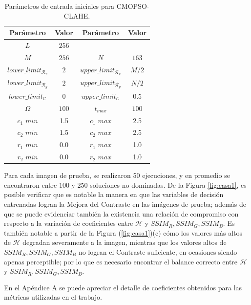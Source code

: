 \begin{table}[H]
\setlength{\abovecaptionskip}{2pt plus 3pt minus 2pt} %
\caption[Parámetros de entrada para $MOPSO$]{Parámetros de entrada iniciales para CMOPSO-CLAHE.}
\begin{center}
 \begin{tabular}{||c c | c c||} 
 \hline
 Parámetro & Valor & Parámetro & Valor \\ [0.5ex] 
 \hline\hline
 $L$ & $256$ &     &       \\ 
 \hline
 $M$ & $256$ & $N$ & $163$ \\ 
 \hline
 $lower\_limit_{\mathscr{R}_x}$ & $2$ & $upper\_limit_{\mathscr{R}_x}$ & $M/2$ \\ 
 \hline
 $lower\_limit_{\mathscr{R}_y}$ & $2$ & $upper\_limit_{\mathscr{R}_y}$ & $N/2$ \\  
 \hline
 $lower\_limit_{{\mathscr{C}}}$ & $0$ & $upper\_limit_{{\mathscr{C}}}$ & 0.5 \\
\hline
$\Omega$ & $100$ & $t_{max}$ & $100$ \\ 
\hline
$c_1$ $min$ & 1.5 & $c_1$ $max$ & 2.5 \\ 
\hline
$c_2$ $min$ & 1.5 & $c_2$ $max$ & 2.5 \\ 
\hline
$r_1$ $min$ & 0.0 & $r_1$ $max$ & 1.0 \\ 
\hline
$r_2$ $min$ & 0.0 & $r_2$ $max$ & 1.0 \\
\hline
\end{tabular}
\end{center}
\label{table:parametrospso}
\end{table}

Para cada imagen de prueba, se realizaron 50 ejecuciones, y en promedio se encontraron entre 100 y 250 soluciones no dominadas. De la Figura \ref{fig:casa1}, es posible verificar que es notable la manera en que las variables de decisión entrenadas logran la Mejora del Contraste en las imágenes de prueba; además de que se puede evidenciar también la existencia una relación de compromiso con respecto a la variación de coeficientes entre $\mathscr{H}$ y $SSIM_R,SSIM_G,SSIM_B$. Es también notable a partir de la Figura (\ref{fig:casa1})(c) cómo los valores más altos de $\mathscr{H}$ degradan severamente a la imagen, mientras que los valores altos de $SSIM_R,SSIM_G,SSIM_B$ no logran el Contraste suficiente, en ocasiones siendo apenas perceptible; por lo que es necesario encontrar el balance correcto entre $\mathscr{H}$ y $SSIM_R,SSIM_G,SSIM_B$.

En el Apéndice A se puede apreciar el detalle de coeficientes obtenidos para las métricas utilizadas en el trabajo.


